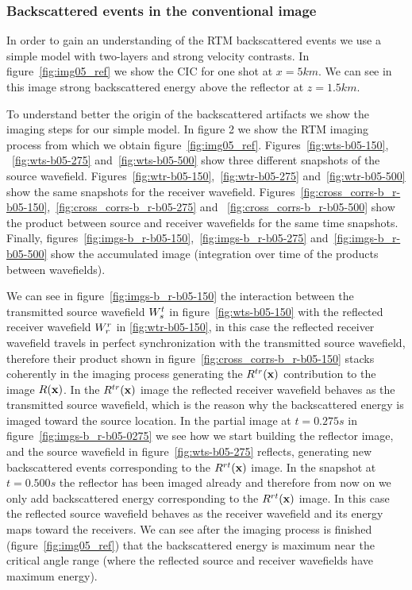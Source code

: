 \subsubsection{Backscattered events in the conventional image}

In order to gain an understanding of the RTM backscattered events we use a simple model with two-layers and strong velocity
contrasts. In figure~\ref{fig:img05_ref} we show the CIC for one shot at $x=5km$. We can see in this image strong 
backscattered energy above the reflector at $z=1.5km$.

To understand better the origin of the backscattered artifacts we show the imaging steps for our simple model.
In figure 2 we show the RTM imaging process from which we obtain figure~\ref{fig:img05_ref}. Figures~\ref{fig:wts-b05-150},
~\ref{fig:wts-b05-275} and~\ref{fig:wts-b05-500} show three different snapshots
of the source wavefield. Figures~\ref{fig:wtr-b05-150},~\ref{fig:wtr-b05-275} and~\ref{fig:wtr-b05-500}
show the same snapshots for the receiver wavefield. Figures~\ref{fig:cross_corrs-b_r-b05-150},~\ref{fig:cross_corrs-b_r-b05-275} and
~\ref{fig:cross_corrs-b_r-b05-500} show the product between source and receiver wavefields for the same time snapshots. Finally,
figures~\ref{fig:imgs-b_r-b05-150},~\ref{fig:imgs-b_r-b05-275} and~\ref{fig:imgs-b_r-b05-500} show the accumulated image (integration over time of 
the products between wavefields).






We can see in figure~\ref{fig:imgs-b_r-b05-150} the interaction between the transmitted source wavefield ${W_s^t}$ in figure~\ref{fig:wts-b05-150} with 
the reflected receiver wavefield ${W_r^r}$ in \ref{fig:wtr-b05-150}, in this case the reflected receiver wavefield travels in perfect synchronization
with the transmitted source wavefield, therefore their product shown in figure~\ref{fig:cross_corrs-b_r-b05-150} stacks coherently in the imaging 
process generating the $R^{tr}({\bf x})$ contribution to the image $R({\bf x})$. In the $R^{tr}({\bf x})$ image the reflected 
receiver wavefield behaves as the transmitted source wavefield, which is the reason why the backscattered energy is imaged toward the source location. 
%
%
 In the partial image at $t=0.275s$ in figure~\ref{fig:imgs-b_r-b05-0275} we see how we start building the reflector image,
and the source wavefield in figure~\ref{fig:wts-b05-275} reflects, generating new backscattered events
corresponding to the  $R^{rt}({\bf x})$ image.
%
%
In the snapshot at $t=0.500s$ the reflector has been imaged already and 
therefore from now on we only add backscattered energy corresponding to the $R^{rt}({\bf x})$ image. In this case the 
reflected source wavefield behaves as the receiver wavefield and its energy maps toward the receivers. We can see after
 the imaging process is finished (figure~\ref{fig:img05_ref}) that the backscattered energy is maximum near the critical
 angle range (where the reflected source and receiver wavefields have maximum energy).

